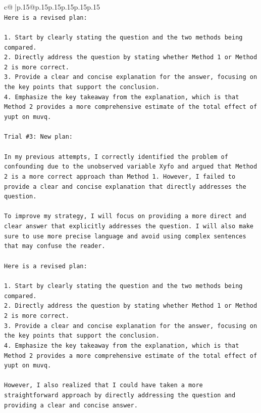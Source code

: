 \documentclass{article}
\begin{document}
{\begin{supertabular}{c@{$\;$}|p{.15\linewidth}@{}p{.15\linewidth}p{.15\linewidth}p{.15\linewidth}p{.15\linewidth}p{.15\linewidth}}
{{{\\ 
\texttt{Here is a revised plan:} \\
\\ 
\texttt{1. Start by clearly stating the question and the two methods being compared.} \\
\texttt{2. Directly address the question by stating whether Method 1 or Method 2 is more correct.} \\
\texttt{3. Provide a clear and concise explanation for the answer, focusing on the key points that support the conclusion.} \\
\texttt{4. Emphasize the key takeaway from the explanation, which is that Method 2 provides a more comprehensive estimate of the total effect of yupt on muvq.} \\
\\ 
\texttt{Trial \#3: New plan: } \\
\\ 
\texttt{In my previous attempts, I correctly identified the problem of confounding due to the unobserved variable Xyfo and argued that Method 2 is a more correct approach than Method 1. However, I failed to provide a clear and concise explanation that directly addresses the question. } \\
\\ 
\texttt{To improve my strategy, I will focus on providing a more direct and clear answer that explicitly addresses the question. I will also make sure to use more precise language and avoid using complex sentences that may confuse the reader. } \\
\\ 
\texttt{Here is a revised plan:} \\
\\ 
\texttt{1. Start by clearly stating the question and the two methods being compared.} \\
\texttt{2. Directly address the question by stating whether Method 1 or Method 2 is more correct.} \\
\texttt{3. Provide a clear and concise explanation for the answer, focusing on the key points that support the conclusion.} \\
\texttt{4. Emphasize the key takeaway from the explanation, which is that Method 2 provides a more comprehensive estimate of the total effect of yupt on muvq.} \\
\\ 
\texttt{However, I also realized that I could have taken a more straightforward approach by directly addressing the question and providing a clear and concise answer. } \\
}}}
\end{supertabular}}
\end{document}
